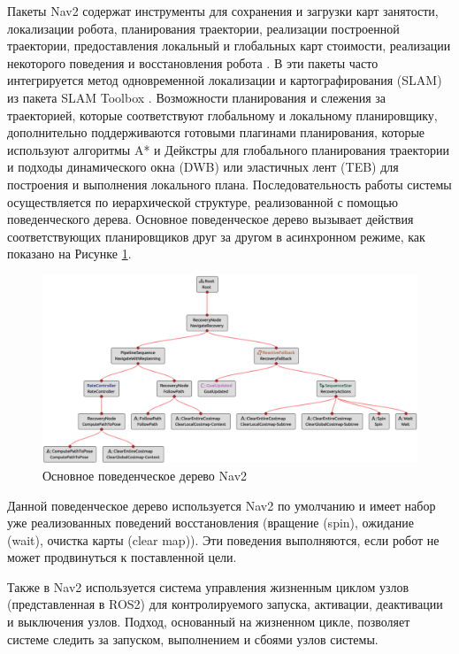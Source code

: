 Пакеты Nav2 содержат инструменты для сохранения и загрузки карт занятости, локализации робота, планирования траектории, реализации построенной траектории, предоставления локальный и глобальных карт стоимости, реализации некоторого поведения и восстановления робота \cite{ros2-mara}. В эти пакеты часто интегрируется метод одновременной локализации и картографирования (SLAM) из пакета SLAM Toolbox \cite{slam-toolbox}. Возможности планирования и слежения за траекторией, которые соответствуют глобальному и локальному планировщику, дополнительно поддерживаются готовыми плагинами планирования, которые используют алгоритмы A* и Дейкстры для глобального планирования траектории и подходы динамического окна (DWB) или эластичных лент (TEB) для построения и выполнения локального плана. Последовательность работы системы осуществляется по иерархической структуре, реализованной с помощью поведенческого дерева. Основное поведенческое дерево вызывает действия соответствующих планировщиков друг за другом в асинхронном режиме, как показано на Рисунке \ref*{fig:nav2_bt}.

\begin{figure}[h]
    \centering
    \includegraphics[width=1.0\textwidth]{images/chap_2/nav2_bt.png}
    \caption{Основное поведенческое дерево Nav2}
    \label{fig:nav2_bt}
\end{figure}

Данной поведенческое дерево используется Nav2 по умолчанию и имеет набор уже реализованных поведений восстановления (вращение (spin), ожидание (wait), очистка карты (clear map)). Эти поведения выполняются, если робот не может продвинуться к поставленной цели. 

Также в Nav2 используется система управления жизненным циклом узлов (представленная в ROS2) для контролируемого запуска, активации, деактивации и выключения узлов. Подход, основанный на жизненном цикле, позволяет системе следить за запуском, выполнением и сбоями узлов системы.

